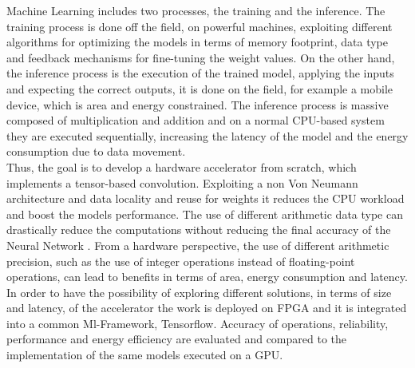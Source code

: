 Machine Learning includes two processes, the training and the inference. The training process is done off the field, on powerful machines, exploiting different algorithms for optimizing the models in terms of memory footprint, data type and feedback mechanisms for fine-tuning the weight values. On the other hand, the inference process is the execution of the trained model, applying the inputs and expecting the correct outputs, it is done on the field, for example a mobile device, which is area and energy constrained. The inference process is massive composed of multiplication and addition and on a normal CPU-based system they are executed sequentially, increasing the latency of the model and the energy consumption due to data movement.\\
Thus, the goal is to develop a hardware accelerator from scratch, which implements a tensor-based convolution. Exploiting a non Von Neumann architecture and data locality and reuse for weights it reduces the CPU workload and boost the models performance. The use of different arithmetic data type can drastically reduce the computations without reducing the final accuracy of the Neural Network \cite{paper:7} \cite{paper:8}. From a hardware perspective, the use of different arithmetic precision\cite{paper:14}, such as the use of integer operations instead of floating-point operations, can lead to benefits in terms of area, energy consumption and latency.\\

In order to have the possibility of exploring different solutions, in terms of size and latency, of the accelerator the work is deployed on FPGA and it is integrated into a common Ml-Framework, Tensorflow. Accuracy of operations, reliability, performance and energy efficiency are evaluated and compared to the implementation of the same models executed on a GPU.
